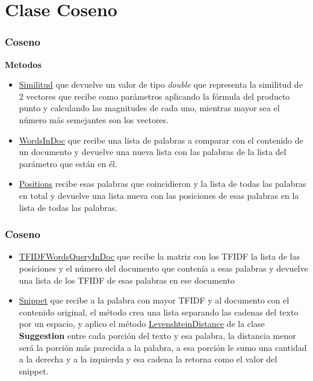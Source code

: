 
\section{Clase Coseno}
\begin{frame}
    \frametitle{Coseno}
    \textbf{Metodos}

    \begin{itemize}
        \item \underline{Similitud} que devuelve un valor de tipo \textit{double} que representa la similitud
        de 2 vectores que recibe como parámetros aplicando la fórmula del
        producto punto y calculando las magnitudes de cada uno, mientras
        mayor sea el número más semejantes son los vectores.

        \item \underline{WordsInDoc} que recibe una lista de palabras a comparar con el
        contenido de un documento y devuelve una nueva lista con las palabras
        de la lista del parámetro que están en él.
    
        \item \underline{Positions} recibe esas palabras que coincidieron y la lista de todas las
        palabras en total y devuelve una lista nueva con las posiciones de esas
        palabras en la lista de todas las palabras.
    \end{itemize}
\end{frame}
    
\begin{frame}
    \frametitle{Coseno}
    \begin{itemize}
        \item \underline{TFIDFWordsQueryInDoc} que recibe la matriz con los TFIDF
        la lista
        de las posiciones y el número del documento que contenía a esas
        palabras y devuelve una lista de los TFIDF de esas palabras en ese
        documento
        \item \underline{Snippet} que recibe a la palabra con mayor TFIDF y al documento con
        el contenido original, el método crea una lista separando las cadenas
        del texto por un espacio, y aplico el método \underline{LevenshteinDistance} de la
        clase \textbf{Suggestion} entre cada porción del texto y esa palabra, la distancia
        menor será la porción más parecida a la palabra, a esa porción le sumo
        una cantidad a la derecha y a la izquierda y esa cadena la retorna como
        el valor del snippet.
    \end{itemize}
       
\end{frame}